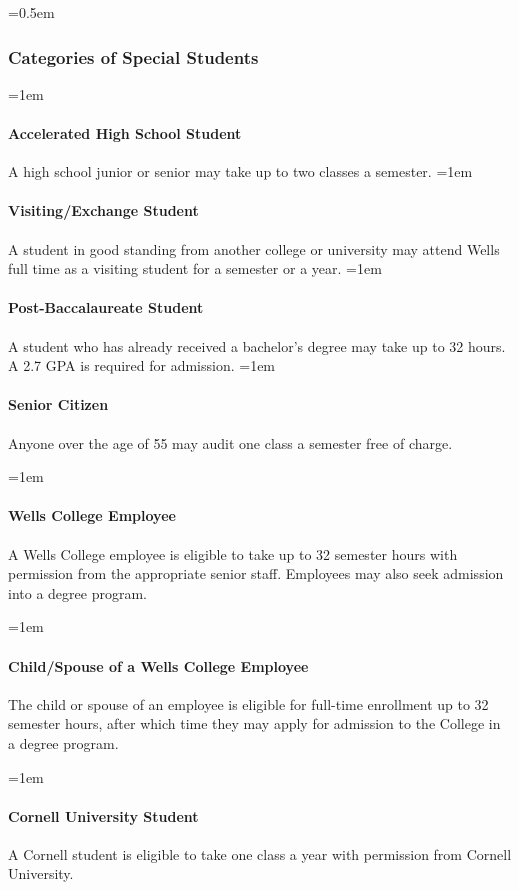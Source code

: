 \documentclass{manual}
\let\oldsubsubsection\subsubsection
\renewcommand\subsubsection{\leftskip=0.5em\oldsubsubsection}
\let\oldparagraph\paragraph
\renewcommand\paragraph{\leftskip=1em\oldparagraph}
\begin{document}
\subsubsection{Categories of Special Students}\label{sub:CategoriesOfSpecialStudents}

\paragraph{Accelerated High School Student} A high school junior or senior may take up to two classes a semester.
\paragraph{Visiting/Exchange Student} A student in good standing from another college or university may attend Wells full time as a visiting student for a semester or a year.
\paragraph{Post-Baccalaureate Student} A student who has already received a bachelor's degree may take up to 32 hours. A 2.7 GPA is required for admission. 
\paragraph{Senior Citizen} Anyone over the age of 55 may audit one class a semester free of charge.



\paragraph{Wells College Employee}\label{par:employeeClasses} A Wells College employee is eligible to take up to 32 semester hours with permission from the appropriate senior staff. Employees may also seek admission into a degree program.

\paragraph{Child/Spouse of a Wells College Employee}\label{par:spouseClasses} The child or spouse of an employee is eligible for full-time enrollment up to 32 semester hours, after which time they may apply for admission to the College in a degree program.

\paragraph{Cornell University Student} A Cornell student is eligible to take one class a year with permission from Cornell University.
\end{document}

